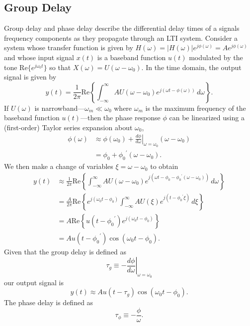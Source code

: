 \documentclass{article}
\begin{document}
		\subsection{Group Delay}
Group delay and phase delay describe the differential delay times of a signals frequency components as they propagate through an LTI system. Consider a system whose transfer function is given by $H(\omega)=|H(\omega)|e^{j\phi(\omega)}=Ae^{j\phi(\omega)}$ and whose input signal $x(t)$ is a baseband function $u(t)$ modulated by the tone $\mathrm{Re}\{e^{j\omega_0t}\}$ so that $X(\omega)=U(\omega-\omega_0)$. In the time domain, the output signal is given by
\begin{equation}
	y(t)=\frac{1}{2\pi}\mathrm{Re}\left\{\int^{\infty}_{-\infty}{AU(\omega-\omega_0)e^{j(\omega{t}-\phi(\omega))}\,d\omega}\right\}.
\end{equation}
If $U(\omega)$ is narrowband---$\omega_m\ll\omega_0$ where $\omega_m$ is the maximum frequency of the baseband function $u(t)$---then the phase response $\phi$ can be linearized using a (first-order) Taylor series expansion about $\omega_0$,
\begin{equation}
	\begin{split}
		\phi(\omega)&\approx\phi(\omega_0)+\left.\frac{d\phi}{d\omega}\right|_{\omega=\omega_0}(\omega-\omega_0)\\
		&=\phi_0+{\phi_0}^\prime(\omega-\omega_0).
	\end{split}
\end{equation}
We then make a change of variables $\xi=\omega-\omega_0$ to obtain
\begin{equation}
	\begin{split}
		y(t)&\approx\frac{1}{2\pi}\mathrm{Re}\left\{\int^{\infty}_{-\infty}{AU(\omega-\omega_0)e^{j(\omega{t}-\phi_0-{\phi_0}^\prime(\omega-\omega_0))}\,d\omega}\right\}\\
		&=\frac{A}{2\pi}\mathrm{Re}\left\{e^{j(\omega_0t-\phi_0)}\int^{\infty}_{-\infty}{AU(\xi)e^{j(t-{\phi_0}^\prime\xi)}\,d\xi}\right\}\\
		&=A\mathrm{Re}\left\{u(t-{\phi_0}^\prime)e^{j(\omega_0t-\phi_0)}\right\}\\
		&=Au(t-{\phi_0}^\prime)\cos{(\omega_0t-\phi_0)}.
	\end{split}
\end{equation}
Given that the group delay is defined as
\begin{equation}
	\tau_g\equiv-\left.\frac{d\phi}{d\omega}\right|_{\omega=\omega_0}
\end{equation}
our output signal is
\begin{equation}
	y(t)\approx{Au(t-\tau_g)\cos{(\omega_0t-\phi_0)}}.
\end{equation}
The phase delay is defined as
\begin{equation}
	\tau_\phi\equiv-\frac{\phi}{\omega}.
\end{equation}
\end{document}
